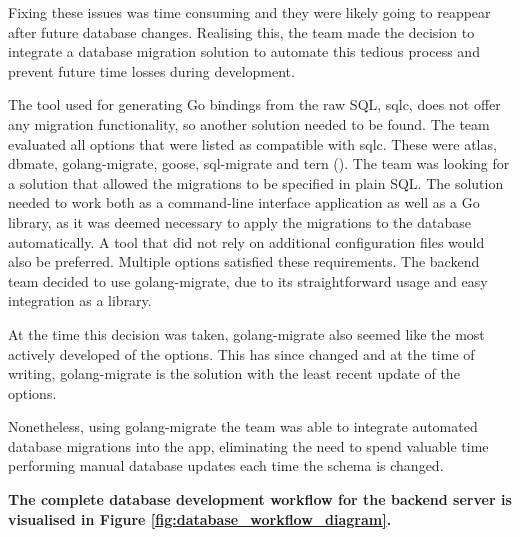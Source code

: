 Fixing these issues was time consuming and they were likely going to reappear
after future database changes. Realising this, the team made the decision to
integrate a database migration solution to automate this tedious process and
prevent future time losses during development.

The tool used for generating Go bindings from the raw SQL, sqlc, does not offer
any migration functionality, so another solution needed to be found. The team
evaluated all options that were listed as compatible with sqlc. These were
atlas, dbmate, golang-migrate, goose, sql-migrate and tern
(\cite{sqlc_updating_database_schema}). The team was looking for a solution that
allowed the migrations to be specified in plain SQL. The solution needed to work
both as a command-line interface application as well as a Go library, as it was
deemed necessary to apply the migrations to the database automatically. A tool
that did not rely on additional configuration files would also be preferred.
Multiple options satisfied these requirements. The backend team decided to use
golang-migrate, due to its straightforward usage and easy integration as a
library.

At the time this decision was taken, golang-migrate also seemed like
the most actively developed of the options. This has since changed and at the
time of writing, golang-migrate is the solution with the least recent update of
the options.

Nonetheless, using golang-migrate the team was able to integrate automated
database migrations into the app, eliminating the need to spend valuable time
performing manual database updates each time the schema is changed.

\textbf{The complete database development workflow for the backend server is visualised
in Figure \ref{fig:database_workflow_diagram}.}


